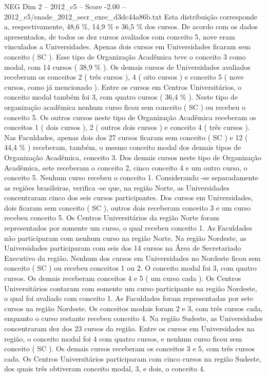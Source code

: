 \begin{textsample}{NEG Dim 2 – 2012\_c5 – Score -2.00 – 2012\_c5/enade\_2012\_secr\_exec\_d3dc44a86b.txt}
Esta distribuição corresponde a, respectivamente, 48,6 \%, 14,9 \% e 36,5 \% dos cursos.
De acordo com os dados apresentados, de todos os dez cursos avaliados com conceito 5, nove eram vinculados a Universidades.
Apenas dois cursos em Universidades ficaram sem conceito ( SC ).
Esse tipo de Organização Acadêmica teve o conceito 3 como modal, com 14 cursos ( 38,9 \% ).
Os demais cursos de Universidades avaliados receberam os conceitos 2 ( três cursos ), 4 ( oito cursos ) e conceito 5 ( nove cursos, como já mencionado ).
Entre os cursos em Centros Universitários, o conceito modal também foi 3, com quatro cursos ( 36,4 \% ).
Neste tipo de organização acadêmica nenhum curso ficou sem conceito ( SC ) ou recebeu o conceito 5.
Os outros cursos neste tipo de Organização Acadêmica receberam os conceitos 1 ( dois cursos ), 2 ( outros dois cursos ) e conceito 4 ( três cursos ).
Nas Faculdades, apenas dois dos 27 cursos ficaram sem conceito ( SC ) e 12 ( 44,4 \% ) receberam, também, o mesmo conceito modal dos demais tipos de Organização Acadêmica, conceito 3.
Dos demais cursos neste tipo de Organização Acadêmica, sete receberam o conceito 2, cinco conceito 4 e um outro curso, o conceito 5.
Nenhum curso recebeu o conceito 1.
Considerando -se separadamente as regiões brasileiras, verifica -se que, na região Norte, as Universidades concentraram cinco dos seis cursos participantes.
Dos cursos em Universidades, dois ficaram sem conceito ( SC ), outros dois receberam conceito 3 e um curso recebeu conceito 5.
Os Centros Universitários da região Norte foram representados por somente um curso, o qual recebeu conceito 1.
As Faculdades não participaram com nenhum curso na região Norte.
Na região Nordeste, as Universidades participaram com seis dos 14 cursos na Área de Secretariado Executivo da região.
Nenhum dos cursos em Universidades no Nordeste ficou sem conceito ( SC ) ou recebeu conceitos 1 ou 2.
O conceito modal foi 3, com quatro cursos.
Os demais receberam conceitos 4 e 5 ( um curso cada ).
Os Centros Universitários contaram com somente um curso participante na região Nordeste, o qual foi avaliado com conceito 1.
As Faculdades foram representadas por sete cursos na região Nordeste.
Os conceitos modais foram 2 e 3, com três cursos cada, enquanto o curso restante recebeu conceito 4.
Na região Sudeste, as Universidades concentraram dez dos 23 cursos da região.
Entre os cursos em Universidades na região, o conceito modal foi 4 com quatro cursos, e nenhum curso ficou sem conceito ( SC ).
Os demais cursos receberam os conceitos 3 e 5, com três cursos cada.
Os Centros Universitários participaram com cinco cursos na região Sudeste, dos quais três obtiveram conceito modal, 3, e dois, o conceito 4.

\end{textsample}
